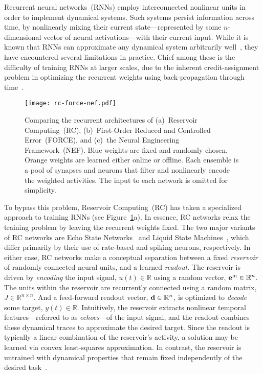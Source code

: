Recurrent neural networks~(RNNs) employ interconnected nonlinear units in order to implement dynamical systems.
Such systems persist information across time, by nonlinearly mixing their current state---represented by some $n$-dimensional vector of neural activations---with their current input.
While it is known that RNNs can approximate any dynamical system arbitrarily well~\citep{funahashi1993approximation}, they have encountered several limitations in practice.
Chief among these is the difficulty of training RNNs at larger scales, due to the inherent credit-assignment problem in optimizing the recurrent weights using back-propagation through time~\citep{bengio1994learning}.

\begin{figure}
  \centering
  \texttt{[image: rc-force-nef.pdf]}
  \caption{ \label{fig:architectures}
    Comparing the recurrent architectures of (a)~Reservoir Computing~(RC), (b)~First-Order Reduced and Controlled Error~(FORCE), and (c)~the Neural Engineering Framework~(NEF).
    Blue weights are fixed and randomly chosen.
    Orange weights are learned either online or offline.
    Each ensemble is a pool of synapses and neurons that filter and nonlinearly encode the weighted activities.
    The input to each network is omitted for simplicity.
  }
\end{figure}

To bypass this problem, Reservoir Computing~(RC) has taken a specialized approach to training RNNs (see Figure~\ref{fig:architectures}a).
In essence, RC networks relax the training problem by leaving the recurrent weights fixed.
The two major variants of RC networks are Echo State Networks~\citep[ESNs;][]{jaeger2001echo} and Liquid State Machines~\citep[LSMs;][]{maass2002real}, which differ primarily by their use of rate-based and spiking neurons, respectively.
In either case, RC networks make a conceptual separation between a fixed {\it reservoir} of randomly connected neural units, and a learned {\it readout}.
The reservoir is driven by {\it encoding} the input signal, $u(t) \in \mathbb{R}$ using a random vector, $\mathbf{e}^\text{in} \in \mathbb{R}^n$.
The units within the reservoir are recurrently connected using a random matrix, $J \in \mathbb{R}^{n \times n}$.
And a feed-forward readout vector, $\mathbf{d} \in \mathbb{R}^{n}$, is optimized to {\it decode} some target, $y(t) \in \mathbb{R}$.
Intuitively, the reservoir extracts nonlinear temporal features---referred to as {\it echoes}---of the input signal, and the readout combines these dynamical traces to approximate the desired target.
Since the readout is typically a linear combination of the reservoir's activity, a solution may be learned via convex least-squares approximation.
In contrast, the reservoir is untrained with dynamical properties that remain fixed independently of the desired task~\citep{lukovsevicius2012reservoir}.

